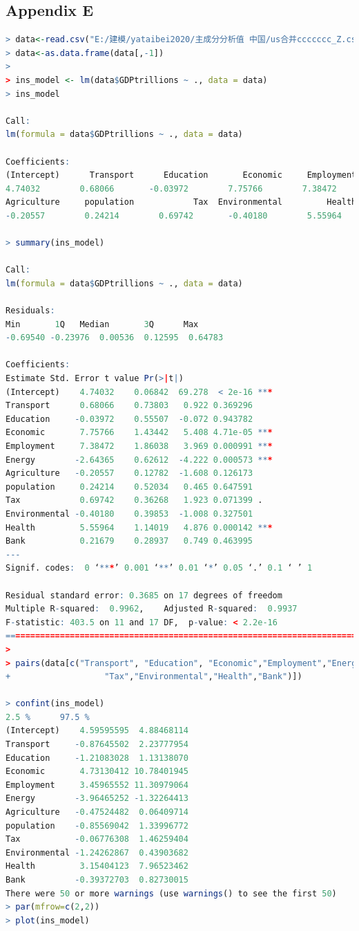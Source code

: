 \documentclass{apmcmthesis}
\begin{document}
\subsection{Appendix E}
\begin{lstlisting}[language=r]
> data<-read.csv("E:/建模/yataibei2020/主成分分析值 中国/us合并ccccccc_Z.csv",stringsAsFactors = FALSE)
> data<-as.data.frame(data[,-1])
> 
> ins_model <- lm(data$GDPtrillions ~ ., data = data)
> ins_model

Call:
lm(formula = data$GDPtrillions ~ ., data = data)

Coefficients:
(Intercept)      Transport      Education       Economic     Employment         Energy  
4.74032        0.68066       -0.03972        7.75766        7.38472       -2.64365  
Agriculture     population            Tax  Environmental         Health           Bank  
-0.20557        0.24214        0.69742       -0.40180        5.55964        0.21679  

> summary(ins_model)

Call:
lm(formula = data$GDPtrillions ~ ., data = data)

Residuals:
Min       1Q   Median       3Q      Max 
-0.69540 -0.23976  0.00536  0.12595  0.64783 

Coefficients:
Estimate Std. Error t value Pr(>|t|)    
(Intercept)    4.74032    0.06842  69.278  < 2e-16 ***
Transport      0.68066    0.73803   0.922 0.369296    
Education     -0.03972    0.55507  -0.072 0.943782    
Economic       7.75766    1.43442   5.408 4.71e-05 ***
Employment     7.38472    1.86038   3.969 0.000991 ***
Energy        -2.64365    0.62612  -4.222 0.000573 ***
Agriculture   -0.20557    0.12782  -1.608 0.126173    
population     0.24214    0.52034   0.465 0.647591    
Tax            0.69742    0.36268   1.923 0.071399 .  
Environmental -0.40180    0.39853  -1.008 0.327501    
Health         5.55964    1.14019   4.876 0.000142 ***
Bank           0.21679    0.28937   0.749 0.463995    
---
Signif. codes:  0 ‘***’ 0.001 ‘**’ 0.01 ‘*’ 0.05 ‘.’ 0.1 ‘ ’ 1

Residual standard error: 0.3685 on 17 degrees of freedom
Multiple R-squared:  0.9962,	Adjusted R-squared:  0.9937 
F-statistic: 403.5 on 11 and 17 DF,  p-value: < 2.2e-16
=========================================================================
> 
> pairs(data[c("Transport", "Education", "Economic","Employment","Energy","Agriculture","population",
+                   "Tax","Environmental","Health","Bank")])

> confint(ins_model)
2.5 %      97.5 %
(Intercept)    4.59595595  4.88468114
Transport     -0.87645502  2.23777954
Education     -1.21083028  1.13138070
Economic       4.73130412 10.78401945
Employment     3.45965552 11.30979064
Energy        -3.96465252 -1.32264413
Agriculture   -0.47524482  0.06409714
population    -0.85569042  1.33996772
Tax           -0.06776308  1.46259404
Environmental -1.24262867  0.43903682
Health         3.15404123  7.96523462
Bank          -0.39372703  0.82730015
There were 50 or more warnings (use warnings() to see the first 50)
> par(mfrow=c(2,2))
> plot(ins_model)
\end{lstlisting}
\end{document}
